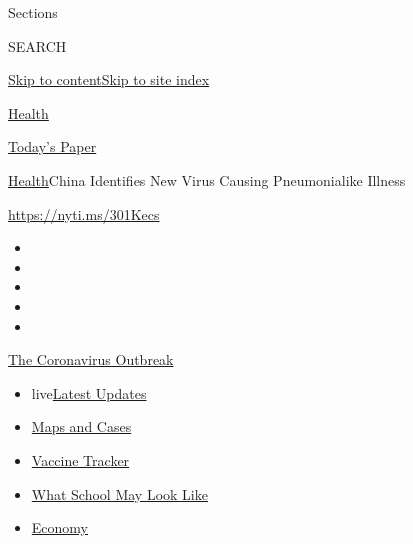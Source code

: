 Sections

SEARCH

\protect\hyperlink{site-content}{Skip to
content}\protect\hyperlink{site-index}{Skip to site index}

\href{https://www.nytimes3xbfgragh.onion/section/health}{Health}

\href{https://myaccount.nytimes3xbfgragh.onion/auth/login?response_type=cookie\&client_id=vi}{}

\href{https://www.nytimes3xbfgragh.onion/section/todayspaper}{Today's
Paper}

\href{/section/health}{Health}\textbar{}China Identifies New Virus
Causing Pneumonialike Illness

\url{https://nyti.ms/301Kecs}

\begin{itemize}
\item
\item
\item
\item
\item
\end{itemize}

\href{https://www.nytimes3xbfgragh.onion/news-event/coronavirus?action=click\&pgtype=Article\&state=default\&region=TOP_BANNER\&context=storylines_menu}{The
Coronavirus Outbreak}

\begin{itemize}
\tightlist
\item
  live\href{https://www.nytimes3xbfgragh.onion/2020/08/01/world/coronavirus-covid-19.html?action=click\&pgtype=Article\&state=default\&region=TOP_BANNER\&context=storylines_menu}{Latest
  Updates}
\item
  \href{https://www.nytimes3xbfgragh.onion/interactive/2020/us/coronavirus-us-cases.html?action=click\&pgtype=Article\&state=default\&region=TOP_BANNER\&context=storylines_menu}{Maps
  and Cases}
\item
  \href{https://www.nytimes3xbfgragh.onion/interactive/2020/science/coronavirus-vaccine-tracker.html?action=click\&pgtype=Article\&state=default\&region=TOP_BANNER\&context=storylines_menu}{Vaccine
  Tracker}
\item
  \href{https://www.nytimes3xbfgragh.onion/interactive/2020/07/29/us/schools-reopening-coronavirus.html?action=click\&pgtype=Article\&state=default\&region=TOP_BANNER\&context=storylines_menu}{What
  School May Look Like}
\item
  \href{https://www.nytimes3xbfgragh.onion/live/2020/07/31/business/stock-market-today-coronavirus?action=click\&pgtype=Article\&state=default\&region=TOP_BANNER\&context=storylines_menu}{Economy}
\end{itemize}

